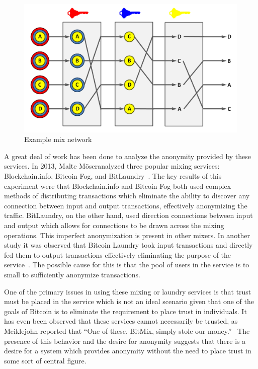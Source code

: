 \documentclass[11pt]{article}
\newcommand{\Moser}{M{\"o}ser}
\begin{document}
\begin{figure}[H]
    \caption[Example mix network]{Example mix network\protect\footnotemark}
    \centering
    \includegraphics[width=.8\linewidth]{figures/mix.png}
\end{figure}


A great deal of work has been done to analyze the anonymity provided by these services.  In 2013, Malte \Moser analyzed
three popular mixing services: Blockchain.info, Bitcoin Fog, and BitLaundry~\cite{moser13}. The key results of this
experiment were that Blockchain.info and Bitcoin Fog both used complex methods of distributing transactions which
eliminate the ability to discover any connection between input and output transactions, effectively anonymizing the
traffic.  BitLaundry, on the other hand, used direction connections between input and output which allows for
connections to be drawn across the mixing operations.  This imperfect anonymization is present in other mixers. In
another study it was observed that Bitcoin Laundry took input transactions and directly fed them to output transactions
effectively eliminating the purpose of the service~\cite{meiklejohn13}. The possible cause for this is that the pool of
users in the service is to small to sufficiently anonymize transactions.

One of the primary issues in using these mixing or laundry services is that trust must be placed in the service which is
not an ideal scenario given that one of the goals of Bitcoin is to eliminate the requirement to place trust in
individuals. It has even been observed that these services cannot necessarily be trusted, as Meiklejohn reported that
``One of these, BitMix, simply stole our money.''~\cite{meiklejohn13} The presence of this behavior and the desire for
anonymity suggests that there is a desire for a system which provides anonymity without the need to place trust in some
sort of central figure.
\end{document}
